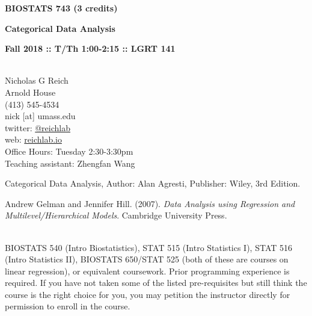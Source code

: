 \documentclass[10pt]{article}
\begin{document}
\centerline{\bf \large BIOSTATS 743 (3 credits)} 
\centerline{\bf \large Categorical Data Analysis}
\centerline{\bf Fall 2018 :: T/Th 1:00-2:15  :: LGRT 141 }

\vspace{.25in}
\\
\noindent Nicholas G Reich \\
 Arnold House \\
\noindent (413) 545-4534 \\
\noindent nick [at] umass.edu \\
\noindent twitter: \href{https://twitter.com/reichlab}{@reichlab}\\
\noindent web: \href{https://reichlab.io}{reichlab.io}\\
\noindent Office Hours: Tuesday 2:30-3:30pm \\
\noindent Teaching assistant: Zhengfan Wang \\


\bigskip
{}


Categorical Data Analysis, Author: Alan Agresti, Publisher: Wiley, 3rd Edition.


Andrew Gelman and Jennifer Hill. (2007). \emph{Data Analysis using Regression and Multilevel/Hierarchical Models}. Cambridge University Press.





\bigskip
{}\\
BIOSTATS 540 (Intro Biostatistics), STAT 515 (Intro Statistics I), STAT 516 (Intro Statistics II), BIOSTATS 650/STAT 525 (both of these are courses on linear regression), or equivalent coursework. Prior programming experience is required. If you have not taken some of the listed pre-requisites but still think the course is the right choice for you, you may petition the instructor directly for permission to enroll in the course.
\end{document}
